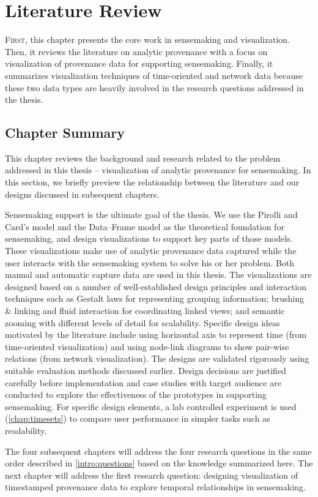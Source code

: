 \chapter{Literature Review}
\label{chap:review}

\graphicspath{{Chapter2/figures/}}

\lettrine{F}{irst}, this chapter presents the core work in sensemaking and visualization. Then, it reviews the literature on analytic provenance with a focus on visualization of provenance data for supporting sensemaking. Finally, it summarizes visualization techniques of time-oriented and network data because these two data types are heavily involved in the research questions addressed in the thesis.






\section{Chapter Summary}
This chapter reviews the background and research related to the problem addressed in this thesis – visualization of analytic provenance for sensemaking. In this section, we briefly preview the relationship between the literature and our designs discussed in subsequent chapters.

Sensemaking support is the ultimate goal of the thesis. We use the Pirolli and Card’s model and the Data–Frame model as the theoretical foundation for sensemaking, and design visualizations to support key parts of those models. These visualizations make use of analytic provenance data captured while the user interacts with the sensemaking system to solve his or her problem. Both manual and automatic capture data are used in this thesis. The visualizations are designed based on a number of well-established design principles and interaction techniques such as Gestalt laws for representing grouping information; brushing \& linking and fluid interaction for coordinating linked views; and semantic zooming with different levels of detail for scalability. Specific design ideas motivated by the literature include using horizontal axis to represent time (from time-oriented visualization) and using node-link diagrams to show pair-wise relations (from network visualization). The designs are validated rigorously using suitable evaluation methods discussed earlier. Design decisions are justified carefully before implementation and case studies with target audience are conducted to explore the effectiveness of the prototypes in supporting sensemaking. For specific design elements, a lab controlled experiment is used (\autoref{chap:timesets}) to compare user performance in simpler tasks such as readability.

The four subsequent chapters will address the four research questions in the same order described in \autoref{intro:questions} based on the knowledge summarized here. The next chapter will address the first research question: designing visualization of timestamped provenance data to explore temporal relationships in sensemaking.